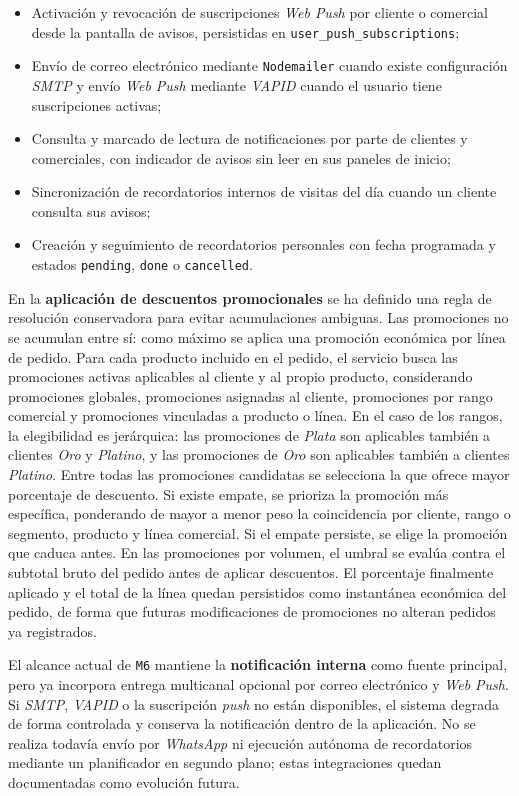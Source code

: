 \begin{itemize}
    \item Activación y revocación de suscripciones \textit{Web Push} por cliente o comercial desde la pantalla de avisos, persistidas en \texttt{user\_push\_subscriptions};
    \item Envío de correo electrónico mediante \texttt{Nodemailer} cuando existe configuración \textit{SMTP} y envío \textit{Web Push} mediante \textit{VAPID} cuando el usuario tiene suscripciones activas;
    \item Consulta y marcado de lectura de notificaciones por parte de clientes y comerciales, con indicador de avisos sin leer en sus paneles de inicio;
    \item Sincronización de recordatorios internos de visitas del día cuando un cliente consulta sus avisos;
    \item Creación y seguimiento de recordatorios personales con fecha programada y estados \texttt{pending}, \texttt{done} o \texttt{cancelled}.
\end{itemize}

En la \textbf{aplicación de descuentos promocionales} se ha definido una regla de resolución conservadora para evitar acumulaciones ambiguas. Las promociones no se acumulan entre sí: como máximo se aplica una promoción económica por línea de pedido. Para cada producto incluido en el pedido, el servicio busca las promociones activas aplicables al cliente y al propio producto, considerando promociones globales, promociones asignadas al cliente, promociones por rango comercial y promociones vinculadas a producto o línea. En el caso de los rangos, la elegibilidad es jerárquica: las promociones de \textit{Plata} son aplicables también a clientes \textit{Oro} y \textit{Platino}, y las promociones de \textit{Oro} son aplicables también a clientes \textit{Platino}. Entre todas las promociones candidatas se selecciona la que ofrece mayor porcentaje de descuento. Si existe empate, se prioriza la promoción más específica, ponderando de mayor a menor peso la coincidencia por cliente, rango o segmento, producto y línea comercial. Si el empate persiste, se elige la promoción que caduca antes. En las promociones por volumen, el umbral se evalúa contra el subtotal bruto del pedido antes de aplicar descuentos. El porcentaje finalmente aplicado y el total de la línea quedan persistidos como instantánea económica del pedido, de forma que futuras modificaciones de promociones no alteran pedidos ya registrados.

El alcance actual de \texttt{M6} mantiene la \textbf{notificación interna} como fuente principal, pero ya incorpora entrega multicanal opcional por correo electrónico y \textit{Web Push}. Si \textit{SMTP}, \textit{VAPID} o la suscripción \textit{push} no están disponibles, el sistema degrada de forma controlada y conserva la notificación dentro de la aplicación. No se realiza todavía envío por \textit{WhatsApp} ni ejecución autónoma de recordatorios mediante un planificador en segundo plano; estas integraciones quedan documentadas como evolución futura.

